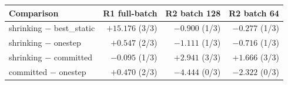\begin{tabular}{lrrr}
\toprule
Comparison & R1 full-batch & R2 batch 128 & R2 batch 64 \\
\midrule
shrinking $-$ best\_static & $+15.176$ (3/3) & $-0.900$ (1/3) & $-0.277$ (1/3) \\
shrinking $-$ onestep & $+0.547$ (2/3) & $-1.111$ (1/3) & $-0.716$ (1/3) \\
shrinking $-$ committed & $-0.095$ (1/3) & $+2.941$ (3/3) & $+1.666$ (3/3) \\
committed $-$ onestep & $+0.470$ (2/3) & $-4.444$ (0/3) & $-2.322$ (0/3) \\
\bottomrule
\end{tabular}
